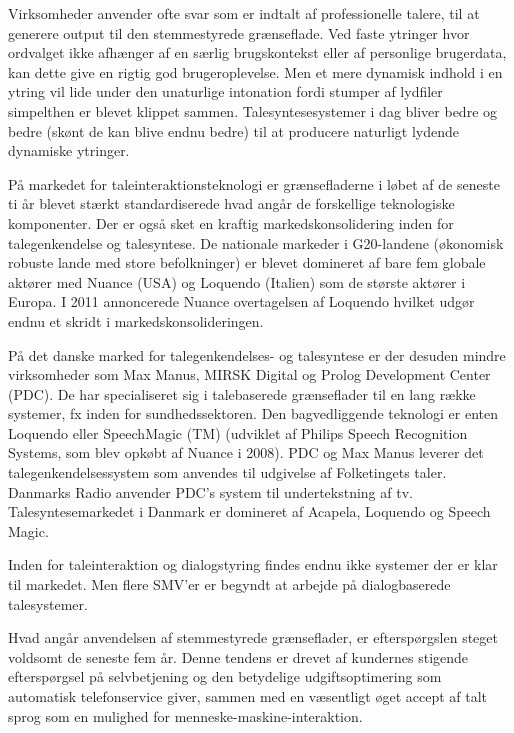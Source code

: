 \begin{multicols}{2}

Virksomheder anvender ofte svar som er indtalt af professionelle talere, til at generere output til den stemmestyrede gr\ae nseflade. Ved faste ytringer hvor ordvalget ikke afh\ae nger af en s\ae rlig brugskontekst eller af personlige brugerdata, kan dette give en rigtig god brugeroplevelse. Men et mere dynamisk indhold i en ytring vil lide under den unaturlige intonation fordi stumper af lydfiler simpelthen er blevet klippet sammen. Talesyntesesystemer i dag bliver bedre og bedre (sk\o nt de kan blive endnu bedre) til at producere naturligt lydende dynamiske ytringer.

\mbox{P\aa} markedet for taleinteraktionsteknologi er gr\ae nsefladerne i l\o bet af de seneste ti \aa r blevet st\ae rkt standardiserede hvad ang\aa r de forskellige teknologiske komponenter. Der er \mbox{ogs\aa} sket en kraftig markedskonsolidering inden for talegenkendelse og talesyntese. De nationale markeder i G20-landene  (\o konomisk robuste lande med store befolkninger) er blevet domineret af bare fem globale akt\o rer med Nuance (USA) og Loquendo (Italien) som de st\o rste akt\o rer i Europa. I 2011 annoncerede Nuance overtagelsen af Loquendo hvilket udg\o r endnu et skridt i markedskonsolideringen. 

\mbox{P\aa} det danske marked for talegenkendelses- og talesyntese er der desuden mindre virksomheder som Max Manus, MIRSK Digital  og Prolog Development Center (PDC). De har specialiseret sig i talebaserede gr\ae nseflader til en lang r\ae kke systemer, fx inden for sundhedssektoren. Den bagvedliggende teknologi er enten Loquendo eller SpeechMagic (TM) (udviklet af Philips Speech Recognition Systems, som blev opk\o bt af Nuance i 2008). PDC og Max Manus leverer det talegenkendelsessystem som anvendes til udgivelse af Folketingets taler. Danmarks Radio anvender PDC's system til undertekstning af tv. Talesyntesemarkedet i Danmark er domineret af Acapela, Loquendo og Speech Magic.

Inden for taleinteraktion og dialogstyring findes endnu ikke systemer der er klar til markedet. Men flere SMV'er er begyndt at arbejde \mbox{p\aa} dialogbaserede talesystemer.

Hvad ang\aa r anvendelsen af stemmestyrede gr\ae nseflader, er eftersp\o rgslen steget voldsomt de seneste fem \aa r. Denne tendens er drevet af kundernes stigende eftersp\o rgsel \mbox{p\aa} selvbetjening og den betydelige udgiftsoptimering som automatisk telefonservice giver, sammen med en v\ae sentligt \o get accept af talt sprog som en mulighed for menneske-maskine-interaktion.


\end{multicols}
